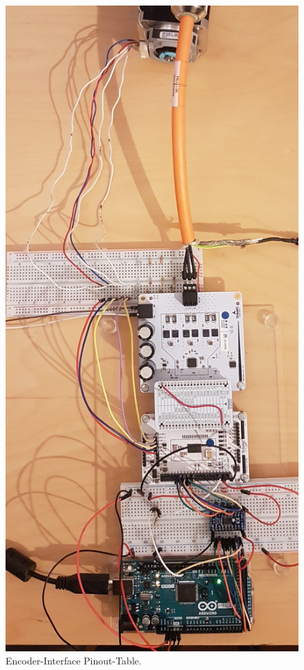 \begin{figure}[H]
	\centering
	\includegraphics[angle = 270, width=\textwidth]{graphics/4_komplett}
	\caption{Encoder-Interface Pinout-Table.}
	\label{fig:4_komplett}
\end{figure}

